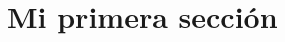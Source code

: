 \documentclass[oneside,svgnames,x11names,x11names,HTML,twoside]{book}
\begin{document}
\chapter{Mi primera sección}
\end{document}
